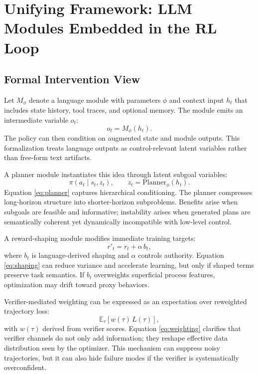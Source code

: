 \documentclass[pdflatex,sn-mathphys-num]{sn-jnl}
\begin{document}
\section{Unifying Framework: LLM Modules Embedded in the RL Loop}
\subsection{Formal Intervention View}
Let $M_\phi$ denote a language module with parameters $\phi$ and context input $h_t$ that includes state history, tool traces, and optional memory. The module emits an intermediate variable $o_t$:
\begin{equation}
o_t=M_\phi(h_t).
\end{equation}
The policy can then condition on augmented state and module outputs. This formalization treats language outputs as control-relevant latent variables rather than free-form text artifacts.

A planner module instantiates this idea through latent subgoal variables:
\begin{equation}
\pi(a_t\mid s_t,z_t),\qquad z_t=\mathrm{Planner}_{\phi}(h_t).
\label{eq:planner}
\end{equation}
Equation \eqref{eq:planner} captures hierarchical conditioning. The planner compresses long-horizon structure into shorter-horizon subproblems. Benefits arise when subgoals are feasible and informative; instability arises when generated plans are semantically coherent yet dynamically incompatible with low-level control.

A reward-shaping module modifies immediate training targets:
\begin{equation}
r'_t=r_t+\alpha\,b_t,
\label{eq:shaping}
\end{equation}
where $b_t$ is language-derived shaping and $\alpha$ controls authority. Equation \eqref{eq:shaping} can reduce variance and accelerate learning, but only if shaped terms preserve task semantics. If $b_t$ overweights superficial process features, optimization may drift toward proxy behaviors.

Verifier-mediated weighting can be expressed as an expectation over reweighted trajectory loss:
\begin{equation}
\mathbb{E}_{\tau}\left[w(\tau)\,L(\tau)\right],
\label{eq:weighting}
\end{equation}
with $w(\tau)$ derived from verifier scores. Equation \eqref{eq:weighting} clarifies that verifier channels do not only add information; they reshape effective data distribution seen by the optimizer. This mechanism can suppress noisy trajectories, but it can also hide failure modes if the verifier is systematically overconfident.
\end{document}
